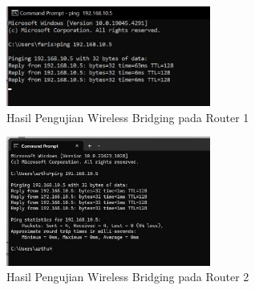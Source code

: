 \begin {enumerate}
    \begin{figure}[H]
        \centering
        \includegraphics[width=0.6\textwidth]{img/router_1_pengujian3.jpeg}
        \caption{Hasil Pengujian Wireless Bridging pada Router 1}
        \label{fig:router1_pengujian3}
    \end{figure}

    \begin{figure}[H]
        \centering
        \includegraphics[width=0.6\textwidth]{img/router_2_pengujian3.jpeg}
        \caption{Hasil Pengujian Wireless Bridging pada Router 2}
        \label{fig:router2_pengujian3}
    \end{figure}


\end {enumerate}